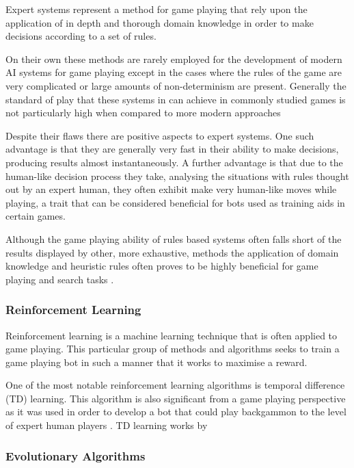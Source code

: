 \documentclass[]{article}
\begin{document}
Expert systems represent a method for game playing that rely upon the application of in depth and thorough domain knowledge in order to make decisions according to a set of rules. 

\par On their own these methods are rarely employed for the development of modern AI systems for game playing except in the cases where the rules of the game are very complicated \autocite{thomas2003real} or large amounts of non-determinism are present. Generally the standard of play that these systems in can achieve in commonly studied games is not particularly high when compared to more modern approaches

\par Despite their flaws there are positive aspects to expert systems. One such advantage is that they are generally very fast in their ability to make decisions, producing results almost instantaneously. A further advantage is that due to the human-like decision process they take, analysing the situations with rules thought out by an expert human, they often exhibit make very human-like moves while playing, a trait that can be considered beneficial for bots used as training aids in certain games.

\par Although the game playing ability of rules based systems often falls short of the results displayed by other, more exhaustive, methods the application of domain knowledge and heuristic rules often proves to be highly beneficial for game playing and search tasks \autocite{pearl1984heuristics}.

\subsubsection{Reinforcement Learning}

Reinforcement learning is a machine learning technique that is often applied to game playing. This particular group of methods and algorithms seeks to train a game playing bot in such a manner that it works to maximise a reward. 

\par One of the most notable reinforcement learning algorithms is temporal difference (TD) learning. This algorithm is also significant from a game playing perspective as it was used in order to develop a bot that could play backgammon to the level of expert human players \autocite{tesauro1995temporal}. TD learning works by 

\subsubsection{Evolutionary Algorithms}
\end{document}
